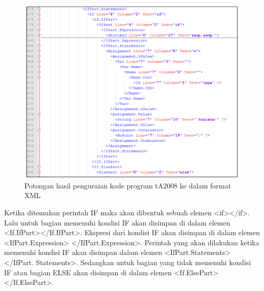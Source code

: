 \begin{figure}
	\centering
	\includegraphics[width=0.95\linewidth]{"gambar/XML tA2008"}
	\caption{Potongan hasil penguraian kode program tA2008 ke dalam format XML}
	\label{fig:xml-ta2008}
\end{figure}

Ketika ditemukan perintah IF maka akan dibentuk sebuah elemen <if></if>. Lalu untuk bagian memenuhi kondisi IF akan disimpan di dalam elemen <If.IfPart></If.IfPart>. Ekspresi dari kondisi IF akan disimpan di dalam elemen <IfPart.Expression> </IfPart.Expression>. Perintah yang akan dilakukan ketika memenuhi kondisi IF akan disimpan dalam elemen <IfPart.Statements></IfPart. Statements>. Sedangkan untuk bagian yang tidak memenuhi kondisi IF atau bagian ELSE akan disimpan di dalam elemen <If.ElsePart></If.ElsePart>. 

